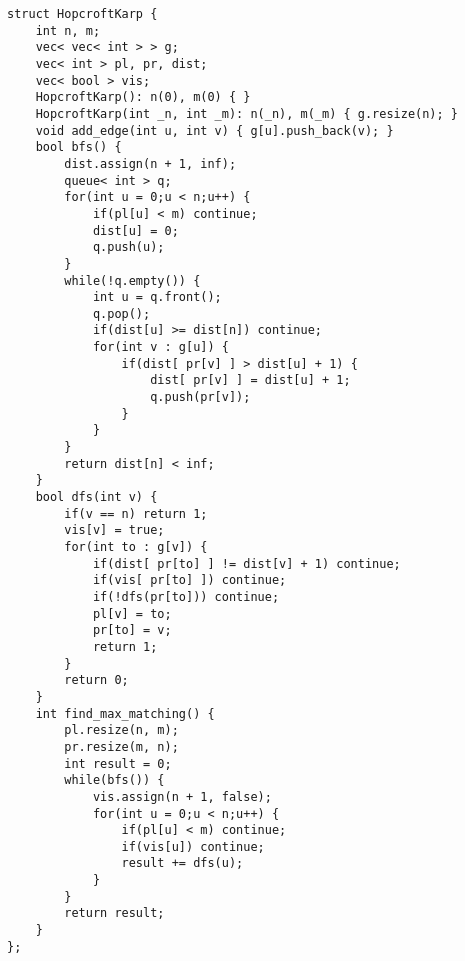 \documentclass[a4paper,12pt]{article}
\begin{document}
\begin{verbatim}
struct HopcroftKarp {
    int n, m;
    vec< vec< int > > g;
    vec< int > pl, pr, dist;
    vec< bool > vis;
    HopcroftKarp(): n(0), m(0) { }
    HopcroftKarp(int _n, int _m): n(_n), m(_m) { g.resize(n); }
    void add_edge(int u, int v) { g[u].push_back(v); }
    bool bfs() {
        dist.assign(n + 1, inf);
        queue< int > q;
        for(int u = 0;u < n;u++) {
            if(pl[u] < m) continue;
            dist[u] = 0;
            q.push(u);
        }
        while(!q.empty()) {
            int u = q.front();
            q.pop();
            if(dist[u] >= dist[n]) continue;
            for(int v : g[u]) {
                if(dist[ pr[v] ] > dist[u] + 1) {
                    dist[ pr[v] ] = dist[u] + 1;
                    q.push(pr[v]);
                }
            }
        }
        return dist[n] < inf;
    }
    bool dfs(int v) {
        if(v == n) return 1;
        vis[v] = true;
        for(int to : g[v]) {
            if(dist[ pr[to] ] != dist[v] + 1) continue;
            if(vis[ pr[to] ]) continue;
            if(!dfs(pr[to])) continue;
            pl[v] = to;
            pr[to] = v;
            return 1;
        }
        return 0;
    }
    int find_max_matching() {
        pl.resize(n, m);
        pr.resize(m, n);
        int result = 0;
        while(bfs()) {
            vis.assign(n + 1, false);
            for(int u = 0;u < n;u++) {
                if(pl[u] < m) continue;
                if(vis[u]) continue;
                result += dfs(u);
            }
        }
        return result;
    }
};
\end{verbatim}
\end{document}
